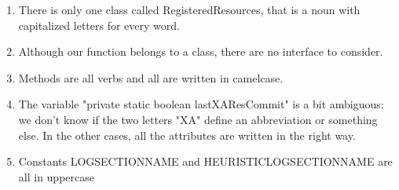 \begin{enumerate}
	\item There is only one class called RegisteredResources, that is a noun with capitalized letters for every word.
	\item Although our function belongs to a class, there are no interface to consider.
	\item Methods are all verbs and all are written in camelcase.
	\item The variable "private static boolean lastXAResCommit" is a bit ambiguous: we don't know if the two letters "XA" define an abbreviation or something else. In the other cases, all the attributes are written in the right way.
	\item Constants LOG\textunderscore SECTION\textunderscore NAME and HEURISTIC\textunderscore LOG\textunderscore SECTION\textunderscore NAME are all in uppercase
\end{enumerate}
